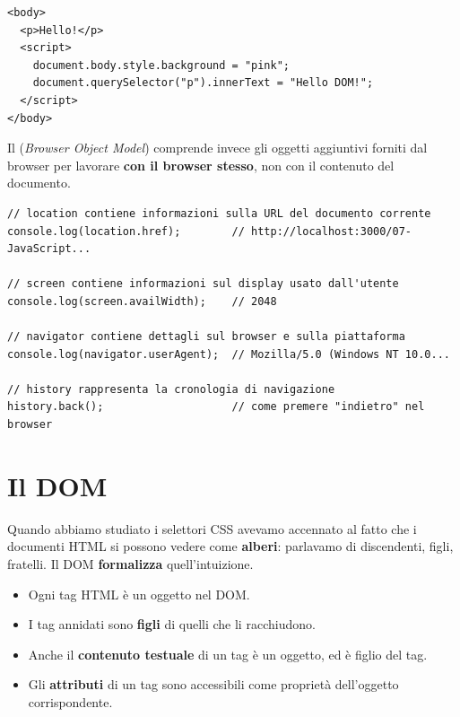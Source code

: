 \begin{affianco}[0.6][c]
\begin{lstlisting}[style=html, name=dom-primo.html]
<body>
  <p>Hello!</p>
  <script>
    document.body.style.background = "pink";
    document.querySelector("p").innerText = "Hello DOM!";
  </script>
</body>
\end{lstlisting}
\risultato
\begin{browser}
  \vspace*{-6pt}\noindent{}\vspace*{-6pt}
\end{browser}
\end{affianco}

Il  (\textit{Browser Object Model}) comprende invece gli oggetti
aggiuntivi forniti dal browser per lavorare \textbf{con il browser stesso},
non con il contenuto del documento.

\begin{lstlisting}[style=js, name=bom.js]
// location contiene informazioni sulla URL del documento corrente
console.log(location.href);        // http://localhost:3000/07-JavaScript...

// screen contiene informazioni sul display usato dall'utente
console.log(screen.availWidth);    // 2048

// navigator contiene dettagli sul browser e sulla piattaforma
console.log(navigator.userAgent);  // Mozilla/5.0 (Windows NT 10.0...

// history rappresenta la cronologia di navigazione
history.back();                    // come premere "indietro" nel browser
\end{lstlisting}

\section{Il DOM}

Quando abbiamo studiato i selettori CSS avevamo accennato al fatto che i
documenti HTML si possono vedere come \textbf{alberi}: parlavamo di discendenti,
figli, fratelli. Il DOM \textbf{formalizza} quell'intuizione.

\begin{itemize}
  \item Ogni tag HTML è un oggetto nel DOM.
  \item I tag annidati sono \textbf{figli} di quelli che li racchiudono.
  \item Anche il \textbf{contenuto testuale} di un tag è un oggetto, ed è figlio
        del tag.
  \item Gli \textbf{attributi} di un tag sono accessibili come proprietà
        dell'oggetto corrispondente.
\end{itemize}

